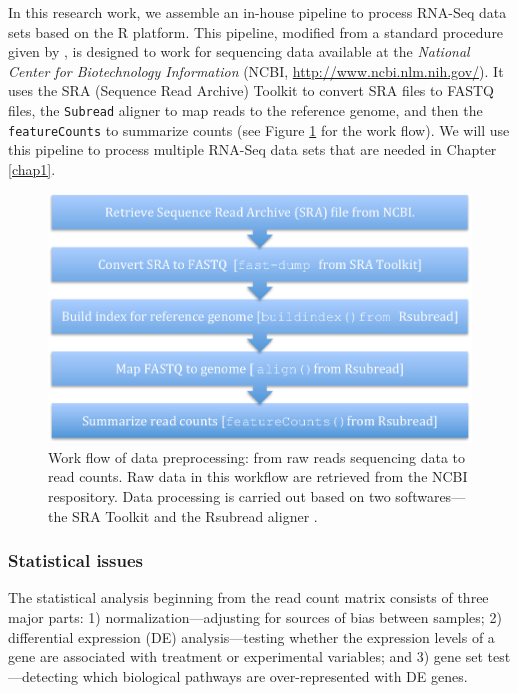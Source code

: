 In this research work, we assemble an in-house pipeline to process RNA-Seq data sets based on the R \citep{Rpackage}
platform.
This pipeline, modified from a standard procedure given by \citet{anders2013count},   is designed to work
for sequencing data available at the \textit{National Center for Biotechnology Information} (NCBI,
\url{http://www.ncbi.nlm.nih.gov/}). It uses the SRA (Sequence Read Archive) Toolkit
\citep{leinonen2010sequence} to convert SRA files to FASTQ files, the \verb|Subread| aligner
\citep{liao2013subread} to map reads to the reference genome, and then the \verb|featureCounts| 
\citep{liao2013featurecounts} to summarize
counts (see Figure \ref{fig:flowchart} for the work flow). We will use this pipeline to process 
multiple
RNA-Seq data sets that are needed in Chapter \ref{chap1}.
\begin{figure}[!ht]
	\centering
	\includegraphics[width=0.7\linewidth]{Figures/flowchart.pdf}
	\caption{Work flow of data preprocessing: from raw reads sequencing data to read counts. Raw 
	data in this workflow are retrieved from the NCBI respository. Data processing is carried out 
	based on two softwares---the SRA Toolkit \citep{leinonen2010sequence} and the Rsubread aligner 
	\citep{liao2013subread}.}
	\label{fig:flowchart}
\end{figure}	



\subsubsection{Statistical issues}
The statistical analysis beginning from the read count matrix consists of three major parts: 1)
normalization---adjusting for sources of bias between samples; 2) differential expression (DE)
analysis---testing whether the expression levels of a gene are associated with treatment or 
experimental variables; 
and 3) gene set test---detecting which biological pathways are over-represented with DE genes.

